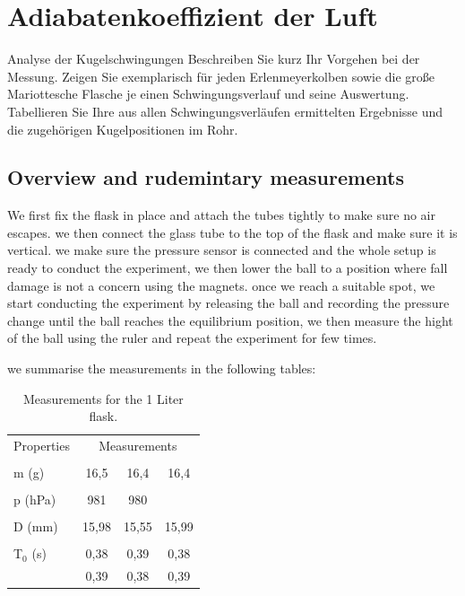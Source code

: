 \section{Adiabatenkoeffizient der Luft}

\begin{aufgabe}{Analyse der Kugelschwingungen}
  Beschreiben Sie kurz Ihr Vorgehen bei der Messung. Zeigen Sie
  exemplarisch für jeden Erlenmeyerkolben sowie die große Mariottesche
  Flasche je einen Schwingungsverlauf und seine Auswertung. Tabellieren
  Sie Ihre aus allen Schwingungsverläufen ermittelten Ergebnisse und
  die zugehörigen Kugelpositionen im Rohr.
\end{aufgabe}


\subsection{Overview and rudemintary measurements}

We first fix the flask in place and attach the tubes tightly to make sure no air escapes. we then connect the glass tube to the top of the flask and make sure it is vertical. we make sure the pressure sensor is connected and the whole setup is ready to conduct the experiment, we then lower the ball to a position where fall damage is not a concern using the magnets. once we reach a suitable spot, we start conducting the experiment by releasing the ball and recording the pressure change until the ball reaches the equilibrium position, we then measure the hight of the ball using the ruler and repeat the experiment for few times.

\vspace{1em}
we summarise the measurements in the following tables:
\begin{table}[H]
  \begin{tabular}{l|ccc}
    Properties & \multicolumn{3}{|c}{Measurements }  \\ \\ \hline
     m (g) & 16,5 & 16,4 & 16,4  \\
           &  &  &  \\ \hline
     p (hPa)& 981 & 980 &  \\
           &  &  &  \\ \hline
     D (mm) & 15,98 &15,55  &  15,99\\
           &  &  &  \\ \hline
     T$_{0}$ (s) &0,38  & 0,39 & 0,38 \\
           & 0,39 &  0,38 &0,39  \\ \hline
  \end{tabular}
  \caption{Measurements for the 1 Liter flask.}
  \label{tab:beispieltabelle}
\end{table}

